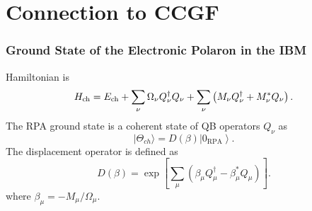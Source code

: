 \section{Connection to CCGF}
\begin{frame}
    \frametitle{Ground State of the Electronic Polaron in the IBM}
Hamiltonian is 
\begin{equation}
H_{\rm ch}
=
E_{\rm ch}
+
\sum_\nu
\Omega_\nu Q_\nu^\dagger Q_\nu
+
\sum_\nu
\left(
M_\nu Q_\nu^\dagger
+
M_\nu^* Q_\nu
\right).
\end{equation}
\pause
The RPA ground state is a coherent state of QB operators $Q_\nu$ as
\begin{equation}
    |\Theta_{ch}\rangle = D(\beta)\left|0_{\mathrm{RPA}}\right\rangle.
\end{equation} 
\pause
The displacement operator is defined as
\begin{equation}
    D(\beta)=\exp \left[\sum_\mu\left(\beta_\mu Q_\mu^{\dagger}-\beta_\mu^* Q_\mu\right)\right] .
\end{equation}
where $\beta_\mu = -M_\mu / \Omega_\mu$.
\end{frame}
